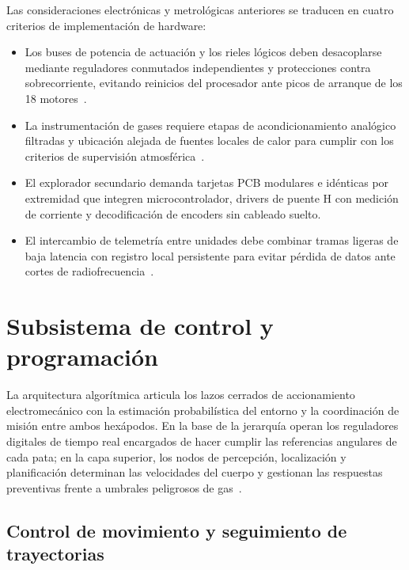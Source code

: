 Las consideraciones electrónicas y metrológicas anteriores se traducen en cuatro criterios de implementación de hardware:

\begin{itemize}
    \item Los buses de potencia de actuación y los rieles lógicos deben desacoplarse mediante reguladores conmutados independientes y protecciones contra sobrecorriente, evitando reinicios del procesador ante picos de arranque de los 18 motores~\cite{AdvancesMining_2023}.
    \item La instrumentación de gases requiere etapas de acondicionamiento analógico filtradas y ubicación alejada de fuentes locales de calor para cumplir con los criterios de supervisión atmosférica~\cite{MINEM_DS024_2016, Cepa2023_sensors, EU_ExposureDirective_2020}.
    \item El explorador secundario demanda tarjetas PCB modulares e idénticas por extremidad que integren microcontrolador, drivers de puente H con medición de corriente y decodificación de encoders sin cableado suelto.
    \item El intercambio de telemetría entre unidades debe combinar tramas ligeras de baja latencia con registro local persistente para evitar pérdida de datos ante cortes de radiofrecuencia~\cite{OSINERGMIN_BoletinGSM_2020, Cortez2016_GEI_Minas}.
\end{itemize}


\section{Subsistema de control y programación}
\label{sec:subsistema_control}

La arquitectura algorítmica articula los lazos cerrados de accionamiento electromecánico con la estimación probabilística del entorno y la coordinación de misión entre ambos hexápodos. En la base de la jerarquía operan los reguladores digitales de tiempo real encargados de hacer cumplir las referencias angulares de cada pata; en la capa superior, los nodos de percepción, localización y planificación determinan las velocidades del cuerpo y gestionan las respuestas preventivas frente a umbrales peligrosos de gas~\cite{siciliano2010robotics, thrun2005probabilistic, KimChoi_2025_MineMapping}.

\subsection{Control de movimiento y seguimiento de trayectorias}

